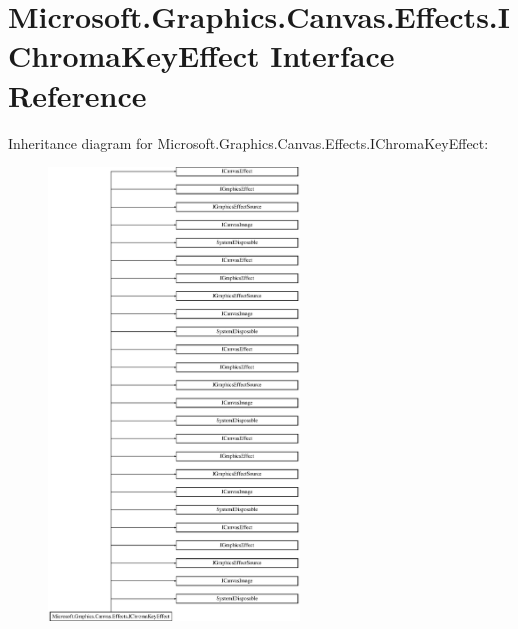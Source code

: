 \hypertarget{interface_microsoft_1_1_graphics_1_1_canvas_1_1_effects_1_1_i_chroma_key_effect}{}\section{Microsoft.\+Graphics.\+Canvas.\+Effects.\+I\+Chroma\+Key\+Effect Interface Reference}
\label{interface_microsoft_1_1_graphics_1_1_canvas_1_1_effects_1_1_i_chroma_key_effect}
Inheritance diagram for Microsoft.\+Graphics.\+Canvas.\+Effects.\+I\+Chroma\+Key\+Effect\+:\begin{figure}[H]
\begin{center}
\leavevmode
\includegraphics[height=12.000000cm]{interface_microsoft_1_1_graphics_1_1_canvas_1_1_effects_1_1_i_chroma_key_effect}
\end{center}
\end{figure}
